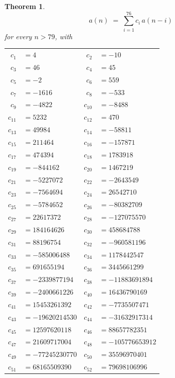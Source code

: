 \documentclass[11pt,a4paper]{article}
\theoremstyle{plain}
\newtheorem{theorem}{Theorem}
\theoremstyle{definition}
\begin{document}
\begin{theorem}
\[
a(n)\;=\;\sum_{i=1}^{76}c_i\,a(n-i)
\]
for every $n>79$, with
\begin{center}\footnotesize
\begin{tabular}{r@{\,}l@{\qquad}r@{\,}l}
$c_{1}$ & $=4$ & $c_{2}$ & $=-10$ \\
$c_{3}$ & $=46$ & $c_{4}$ & $=45$ \\
$c_{5}$ & $=-2$ & $c_{6}$ & $=559$ \\
$c_{7}$ & $=-1616$ & $c_{8}$ & $=-533$ \\
$c_{9}$ & $=-4822$ & $c_{10}$ & $=-8488$ \\
$c_{11}$ & $=5232$ & $c_{12}$ & $=470$ \\
$c_{13}$ & $=49984$ & $c_{14}$ & $=-58811$ \\
$c_{15}$ & $=211464$ & $c_{16}$ & $=-157871$ \\
$c_{17}$ & $=474394$ & $c_{18}$ & $=1783918$ \\
$c_{19}$ & $=-844162$ & $c_{20}$ & $=1467219$ \\
$c_{21}$ & $=-5227072$ & $c_{22}$ & $=-2643549$ \\
$c_{23}$ & $=-7564694$ & $c_{24}$ & $=26542710$ \\
$c_{25}$ & $=-5784652$ & $c_{26}$ & $=-80382709$ \\
$c_{27}$ & $=22617372$ & $c_{28}$ & $=-127075570$ \\
$c_{29}$ & $=184164626$ & $c_{30}$ & $=458684788$ \\
$c_{31}$ & $=88196754$ & $c_{32}$ & $=-960581196$ \\
$c_{33}$ & $=-585006488$ & $c_{34}$ & $=1178442547$ \\
$c_{35}$ & $=691655194$ & $c_{36}$ & $=3445661299$ \\
$c_{37}$ & $=-2339877194$ & $c_{38}$ & $=-11883691894$ \\
$c_{39}$ & $=-2400661226$ & $c_{40}$ & $=16436790169$ \\
$c_{41}$ & $=15453261392$ & $c_{42}$ & $=-7735507471$ \\
$c_{43}$ & $=-19620214530$ & $c_{44}$ & $=-31632917314$ \\
$c_{45}$ & $=12597620118$ & $c_{46}$ & $=88657782351$ \\
$c_{47}$ & $=21609717004$ & $c_{48}$ & $=-105776653912$ \\
$c_{49}$ & $=-77245230770$ & $c_{50}$ & $=35596970401$ \\
$c_{51}$ & $=68165509390$ & $c_{52}$ & $=79698106996$ \\

\end{tabular}
\end{center}
\end{theorem}
\end{document}
